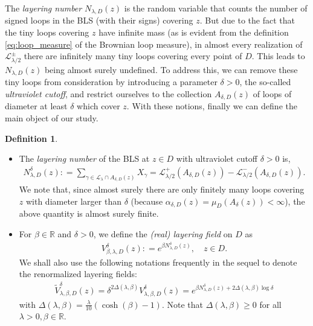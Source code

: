 \documentclass[a4paper, 11pt, reqno]{amsart}
\theoremstyle{definition} \newtheorem{defn}{Definition}[section]
\theoremstyle{remark} \newtheorem{rem}[defn]{Remark}
\theoremstyle{remark} \newtheorem*{rem*}{Remark}
\theoremstyle{plain} \newtheorem{thm}[defn]{Theorem}
\theoremstyle{plain} \newtheorem{lem}[defn]{Lemma}
\theoremstyle{plain} \newtheorem{prop}[defn]{Proposition}
\theoremstyle{plain} \newtheorem{cor}[defn]{Corollary}
\theoremstyle{remark} \newtheorem{exm}[defn]{\textbf{Example}}
\theoremstyle{remark} \newtheorem{exms}[defn]{\textbf{Examples}}
\theoremstyle{remark} \newtheorem*{bl}{}
\numberwithin{equation}{section} %
\newcommand{\mc}{\mathcal}
\newcommand{\R}{\mathbb{R}}
\begin{document}
    The \textit{layering number} $N_{\lambda, D}(z)$ is the random variable that counts the number of signed loops in the BLS (with their signs) covering $z$. But due to the fact that the tiny loops covering $z$ have infinite mass (as is evident from the definition  \eqref{eq:loop_measure} of the Brownian loop measure), in almost every realization of $\mc{L}_{\lambda/2}^{\pm}$ there are infinitely many tiny loops covering every point of $D$. This leads to $N_{\lambda, D}(z)$ being almost surely undefined. To address this, we can remove these tiny loops from consideration by introducing a parameter $\delta>0$, the so-called \textit{ultraviolet cutoff}, and restrict ourselves to the collection $A_{\delta, D}(z)$ of loops of diameter at least $\delta$ which cover $z$. With these notions, finally we can define the main object of our study. 
	\begin{defn}\label{def:real_layering_field}
	   \begin{itemize}
          \item[(i)]  The \textit{layering number} of the BLS at $z \in D$ with ultraviolet cutoff $\delta>0$ is, 
	\begin{align}\label{eq:layering_number_uv}
		 N^{\delta}_{\lambda, D}(z) : = \sum_{\gamma \in \mc{L}_{\lambda} \cap A_{\delta, D}(z) } X_{\gamma} =   \mc{L}_{\lambda/2}^+ (A_{\delta, D}(z)) - \mc{L}_{\lambda/2}^-(A_{\delta, D}(z)).
	\end{align}  
    We note that, since almost surely there are only finitely many loops covering $z$ with diameter larger than $\delta$ (because $\alpha_{\delta, D}(z) = \mu_D(A_{\delta}(z)) < \infty$), the above quantity is almost surely finite. 
	       \item[(ii)] For $\beta \in \R$ and $\delta>0$, we define the \textit{(real) layering field} on $D$ as
		\begin{align}\label{eq:real_layering_field}
			V^{\delta}_{\beta, \lambda, D}(z) : = e^{\beta N^{\delta}_{\lambda, D}(z)}, \quad z \in D.
		\end{align}		
         We shall also use the following notations frequently in the sequel to denote the renormalized layering fields:
	\begin{align}\label{eq:real_LF_normalized}
		\tilde{V}^{\delta}_{\lambda,\beta, D} (z) = \delta^{2 \Delta(\lambda,\beta)} V^{\delta}_{\lambda,\beta, D} (z) = e^{\beta N^{\delta}_{\lambda, D}(z) + 2\Delta(\lambda, \beta) \log \delta} 
	\end{align}   	
	with $\Delta(\lambda, \beta) = \frac{\lambda}{10} (\cosh(\beta)-1)$. Note that $\Delta (\lambda, \beta) \ge 0$ for all $\lambda >0, \beta \in \R$.


\end{itemize}
\end{defn}
\end{document}
